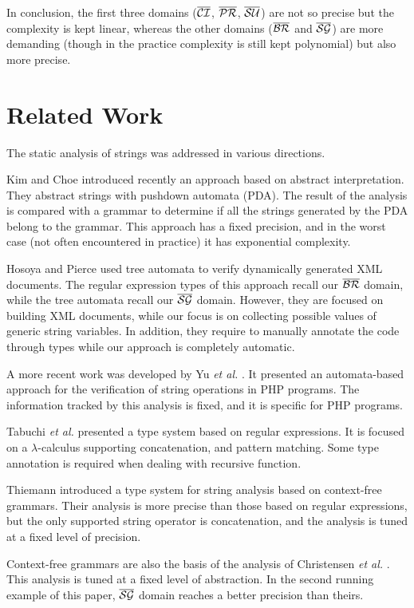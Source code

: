 \documentclass[orivec]{llncs}
\begin{document}
In conclusion, the first three domains ($\mathsf{\overline{\mathsf{\mathcal{CI}}}}$, $\mathsf{\overline{\mathsf{\mathcal{PR}}}}$, $\mathsf{\overline{\mathsf{\mathcal{SU}}}}$) are not so precise but the complexity is kept linear, whereas the other domains ($\mathsf{\overline{\mathsf{\mathcal{BR}}}}$ and $\mathsf{\overline{\mathsf{\mathcal{SG}}}}$) are more demanding (though in the practice complexity is still kept polynomial) but also more precise.
 

\section{Related Work}
\label{sect:relatedwork}
The static analysis of strings was addressed in various directions.

Kim and Choe \cite{KC11} introduced recently an approach based on abstract interpretation. They abstract strings with pushdown automata (PDA). The result of the analysis is compared with a grammar to determine if all the strings generated by the PDA belong to the grammar. This approach has a fixed precision, and in the worst case (not often encountered in practice) it has exponential complexity.

Hosoya and Pierce \cite{HOS03} used tree automata to verify dynamically generated XML documents. The regular expression types of this approach recall our $\mathsf{\overline{\mathsf{\mathcal{BR}}}}$ domain, while the tree automata recall our $\mathsf{\overline{\mathsf{\mathcal{SG}}}}$ domain. However, they are focused on building XML documents, while our focus is on collecting possible values of generic string variables. In addition, they require to manually annotate the code through types while our approach is completely automatic.

A more recent work was developed by Yu \emph{et al.} \cite{YU08}. It presented an automata-based approach for the verification of string operations in PHP programs. The information tracked by this analysis is fixed, and it is specific for PHP programs.

Tabuchi \emph{et al.} \cite{TAB02} presented a type system based on regular expressions. It is focused on a $\lambda$-calculus supporting concatenation, and pattern matching. Some type annotation is required when dealing with recursive function.

Thiemann \cite{THI05} introduced a type system for string analysis based on context-free grammars. Their analysis is more precise than those based on regular expressions, but the only supported string operator is concatenation, and the analysis is tuned at a fixed level of precision. 

Context-free grammars are also the basis of the analysis of Christensen \emph{et al.} \cite{CHR03}. This analysis is tuned at a fixed level of abstraction. In the second running example of this paper, $\mathsf{\overline{\mathsf{\mathcal{SG}}}}$ domain reaches a better precision than theirs.
\end{document}
